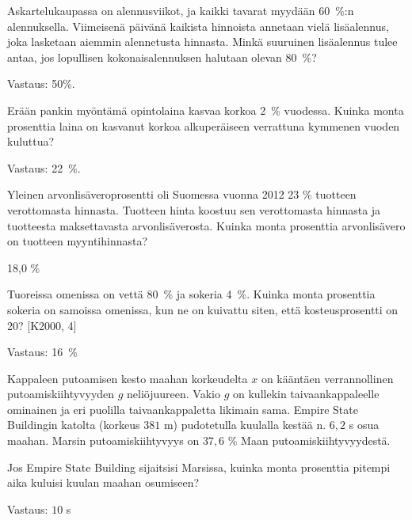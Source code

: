 \begin{tehtava}
    Askartelukaupassa on alennusviikot, ja kaikki tavarat myydään 60~\%:n alennuksella. Viimeisenä päivänä kaikista hinnoista annetaan vielä lisäalennus, joka lasketaan aiemmin alennetusta hinnasta. Minkä suuruinen lisäalennus tulee antaa, jos lopullisen kokonaisalennuksen halutaan olevan 80~\%?
    \begin{vastaus}
        Vastaus: 50\%.
    \end{vastaus}
\end{tehtava}

\begin{tehtava}
    Erään pankin myöntämä opintolaina kasvaa korkoa 2~\% vuodessa. Kuinka monta prosenttia laina on kasvanut korkoa alkuperäiseen verrattuna kymmenen vuoden kuluttua?
    \begin{vastaus}
        Vastaus: 22~\%.
    \end{vastaus}
\end{tehtava}

\begin{tehtava}
Yleinen arvonlisäveroprosentti oli Suomessa vuonna 2012 23 \% tuotteen verottomasta
hinnasta. Tuotteen hinta koostuu sen verottomasta hinnasta
ja tuotteesta maksettavasta arvonlisäverosta. Kuinka monta
prosenttia arvonlisävero on tuotteen myyntihinnasta?
\begin{vastaus}
18,0 \%
\end{vastaus}
\end{tehtava}


\begin{tehtava}
    Tuoreissa omenissa on vettä 80~\% ja sokeria 4~\%. Kuinka monta prosenttia sokeria on samoissa omenissa, kun ne on kuivattu siten, että kosteusprosentti on 20? [K2000, 4]
    \begin{vastaus}
        Vastaus: 16~\%
    \end{vastaus}
\end{tehtava}

\begin{tehtava}
    Kappaleen putoamisen kesto maahan korkeudelta $x$ on kääntäen verrannollinen putoamiskiihtyvyyden $g$ neliöjuureen. Vakio $g$ on kullekin taivaankappaleelle ominainen ja eri puolilla taivaankappaletta likimain sama. Empire State Buildingin katolta (korkeus $381$ m) pudotetulla kuulalla kestää n. $6,2$ s osua maahan. Marsin putoamiskiihtyvyys on $37,6$ \% Maan putoamiskiihtyvyydestä. 
    
    Jos Empire State Building sijaitsisi Marsissa, kuinka monta prosenttia pitempi aika kuluisi kuulan maahan osumiseen?
    \begin{vastaus}
        Vastaus: $10$ s
    \end{vastaus}
\end{tehtava}
